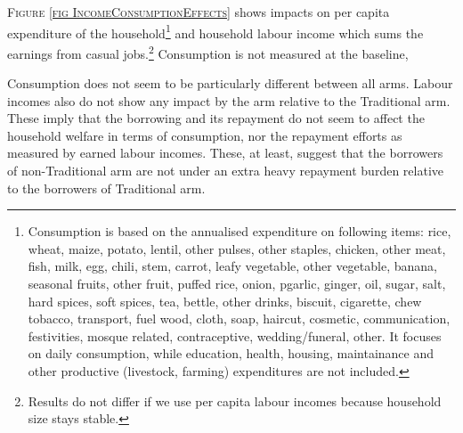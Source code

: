 	\textsc{\small Figure \ref{fig IncomeConsumptionEffects}} shows impacts on per capita expenditure of the household\footnote{Consumption is based on the annualised expenditure on following items: rice, wheat, maize, potato, lentil, other pulses, other staples, chicken, other meat, fish, milk, egg, chili, stem, carrot, leafy vegetable, other vegetable, banana, seasonal fruits, other fruit, puffed rice, onion, pgarlic, ginger, oil, sugar, salt, hard spices, soft spices, tea, bettle, other drinks, biscuit, cigarette, chew tobacco, transport, fuel wood, cloth, soap, haircut, cosmetic, communication, festivities, mosque related, contraceptive, wedding/funeral, other. It focuses on daily consumption, while education, health, housing, maintainance and other productive (livestock, farming) expenditures are not included. } and household labour income which sums the earnings from casual jobs.\footnote{Results do not differ if we use per capita labour incomes because household size stays stable. } Consumption is not measured at the baseline,  %

	Consumption does not seem to be particularly different between all arms. Labour incomes also do not show any impact by the arm relative to the \textsf{Traditional} arm. These imply that the borrowing and its repayment do not seem to affect the household welfare in terms of consumption, nor the repayment efforts as measured by earned labour incomes.  These, at least, suggest that the borrowers of non-\textsf{Traditional} arm are not under an extra heavy repayment burden relative to the borrowers of \textsf{Traditional} arm. 


